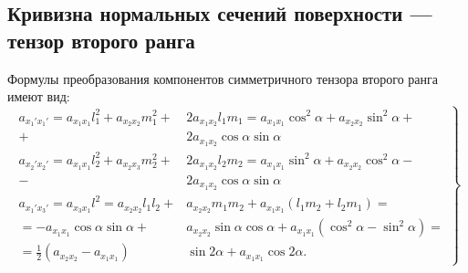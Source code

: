 \documentclass[a4paper,12pt]{article}
\begin{document}
	\subsection{Кривизна нормальных сечений поверхности — тензор второго ранга}
	Формулы преобразования компонентов симметричного тензора второго ранга имеют вид:
	\begin{displaymath}
		\left. \begin{aligned}
		a_{x_{1}'x_{1}'}=a_{x_1 x_1}l_1^2 + a_{x_2 x_2}m_{1}^2 +& 2a_{x_1 x_2}l_1 m_1 = a_{x_1 x_1}\cos^2{\alpha} + a_{x_2 x_2}\sin^2{\alpha} + \\ +&
		2a_{x_1 x_2}\cos{\alpha}\sin{\alpha} \\
		a_{x_{2}'x_{2}'}=a_{x_1 x_1}l_2^2 + a_{x_2 x_3}m_{2}^2 +& 2a_{x_1 x_2}l_2 m_2 = a_{x_1 x_1}\sin^2{\alpha} + a_{x_2 x_2}\cos^2{\alpha} - \\ -&
		2a_{x_1 x_2}\cos{\alpha}\sin{\alpha} \\
		a_{x_{1}'x_{3}'}=a_{x_3 x_1}l^2=a_{x_2 x_2}l_1 l_2 +& a_{x_2 x_2}m_1 m_2 + a_{x_1 x_1}(l_1 m_2 + l_2 m_1) =  \\ =
		-a_{x_1 x_1}\cos{\alpha}\sin{\alpha} +& a_{x_2 x_2}\sin{\alpha}\cos{\alpha} + a_{x_1 x_1}(\cos^2{\alpha} - \sin^2{\alpha}) = \\ = 
		\frac{1}{2}(a_{x_2 x_2} - a_{x_1 x_1})&\sin{2\alpha} + a_{x_1 x_1}\cos{2\alpha}.
		\end{aligned} \right\}
	\end{displaymath}
	
\end{document}

